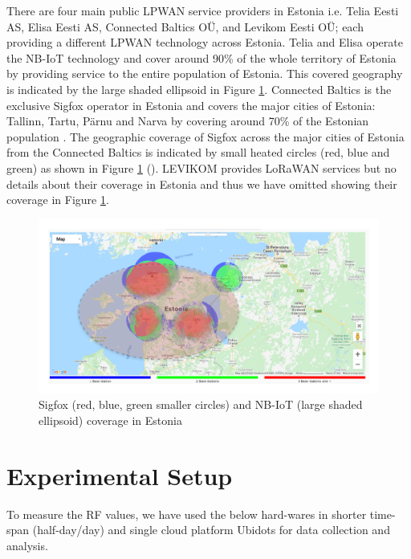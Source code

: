\documentclass[conference,a4paper,xcolor=table]{IEEEtran}
\begin{document}
There are four main public LPWAN service providers in Estonia i.e. Telia Eesti AS, Elisa Eesti AS, Connected Baltics OÜ, and Levikom Eesti OÜ; each providing a different LPWAN technology across Estonia. Telia and Elisa operate the NB-IoT technology and cover around 90\% of the whole territory of Estonia by providing service to the entire population of Estonia. This covered geography is indicated by the large shaded ellipsoid in Figure \ref{CoverageEstonia}. Connected Baltics is the exclusive Sigfox operator in Estonia and covers the major cities of Estonia: Tallinn, Tartu, Pärnu and Narva by covering around 70\% of the Estonian population \cite{connected}. The geographic coverage of Sigfox across the major cities of Estonia from the Connected Baltics is indicated by small heated circles (red, blue and green) as shown in Figure \ref{CoverageEstonia} (\cite{connected}). LEVIKOM \cite{levikom} provides LoRaWAN services but no details about their coverage in Estonia and thus we have omitted showing their coverage in Figure \ref{CoverageEstonia}. \par 


\begin{figure}[h!]
\centering
    \includegraphics[width=0.8\columnwidth]{images/coverage.pdf}
    \caption{Sigfox (red, blue, green smaller circles) and NB-IoT (large shaded ellipsoid) coverage in Estonia}
    \label{CoverageEstonia}
\end{figure}


\section{Experimental Setup}\label{experimental setup}
To measure the RF values, we have used the below hard-wares in shorter time-span (half-day/day) and single cloud platform Ubidots \cite{ubidots} for data collection and analysis.
\end{document}
